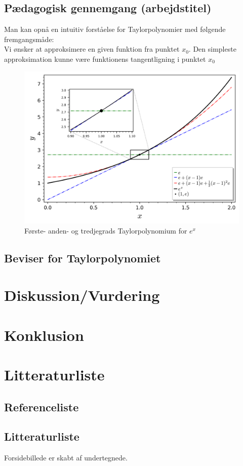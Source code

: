 \documentclass[12pt, a4paper]{article}
\begin{document}
\subsection{Pædagogisk gennemgang (arbejdstitel)}
Man kan opnå en intuitiv forståelse for Taylorpolynomier med følgende fremgangsmåde:\\
Vi ønsker at approksimere en given funktion fra punktet $x_0$. Den simpleste approksimation kunne være funktionens tangentligning i punktet $x_0$
\begin{figure}
     \includegraphics[width=\textwidth]{figures/ex-eksempel.png}
     \caption{Første- anden- og tredjegrads Taylorpolynomium for $e^x$}
     \label{fig:boat1}
\end{figure}
\subsection{Beviser for Taylorpolynomiet}
\section{Diskussion/Vurdering} %
\section{Konklusion} %

\section{Litteraturliste}
\subsection{Referenceliste}
\printbibliography
\subsection{Litteraturliste}
Forsidebillede er skabt af undertegnede.
\end{document}
